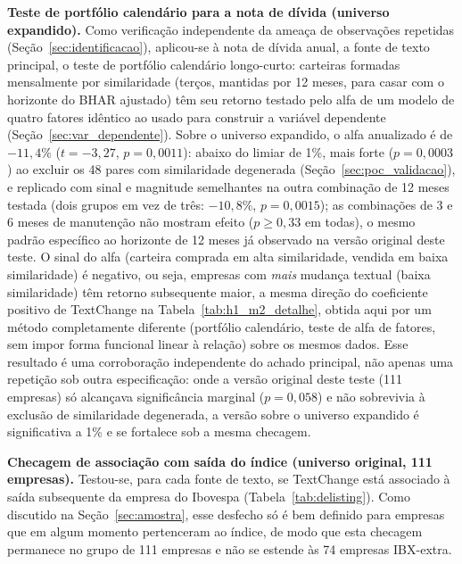 \documentclass[a4paper,12pt]{report}
\begin{document}
\textbf{Teste de portfólio calendário para a nota de dívida (universo expandido).} Como verificação independente da ameaça de observações repetidas (Seção~\ref{sec:identificacao}), aplicou-se à nota de dívida anual, a fonte de texto principal, o teste de portfólio calendário longo-curto: carteiras formadas mensalmente por similaridade (terços, mantidas por 12 meses, para casar com o horizonte do BHAR ajustado) têm seu retorno testado pelo alfa de um modelo de quatro fatores idêntico ao usado para construir a variável dependente (Seção~\ref{sec:var_dependente}). Sobre o universo expandido, o alfa anualizado é de $-11{,}4\%$ ($t=-3{,}27$, $p=0{,}0011$): abaixo do limiar de 1\%, mais forte ($p=0{,}0003$) ao excluir os 48 pares com similaridade degenerada (Seção~\ref{sec:poc_validacao}), e replicado com sinal e magnitude semelhantes na outra combinação de 12 meses testada (dois grupos em vez de três: $-10{,}8\%$, $p=0{,}0015$); as combinações de 3 e 6 meses de manutenção não mostram efeito ($p \geq 0{,}33$ em todas), o mesmo padrão específico ao horizonte de 12 meses já observado na versão original deste teste. O sinal do alfa (carteira comprada em alta similaridade, vendida em baixa similaridade) é negativo, ou seja, empresas com \emph{mais} mudança textual (baixa similaridade) têm retorno subsequente maior, a mesma direção do coeficiente positivo de TextChange na Tabela~\ref{tab:h1_m2_detalhe}, obtida aqui por um método completamente diferente (portfólio calendário, teste de alfa de fatores, sem impor forma funcional linear à relação) sobre os mesmos dados. Esse resultado é uma corroboração independente do achado principal, não apenas uma repetição sob outra especificação: onde a versão original deste teste (111 empresas) só alcançava significância marginal ($p=0{,}058$) e não sobrevivia à exclusão de similaridade degenerada, a versão sobre o universo expandido é significativa a 1\% e se fortalece sob a mesma checagem.

\textbf{Checagem de associação com saída do índice (universo original, 111 empresas).} Testou-se, para cada fonte de texto, se TextChange está associado à saída subsequente da empresa do Ibovespa (Tabela~\ref{tab:delisting}). Como discutido na Seção~\ref{sec:amostra}, esse desfecho só é bem definido para empresas que em algum momento pertenceram ao índice, de modo que esta checagem permanece no grupo de 111 empresas e não se estende às 74 empresas IBX-extra.
\end{document}
